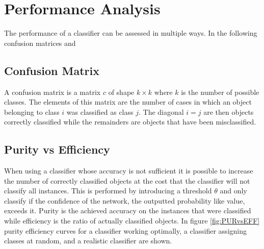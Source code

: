 %
%

\section{Performance Analysis}

The performance of a classifier can be assessed in multiple ways. In the following confusion matrices and 

\subsection{Confusion Matrix}
A confusion matrix is a matrix $c$ of shape $k\times k$ where $k$ is the number of possible classes. The elements of this matrix are the number of cases in which an object belonging to class $i$ was classified as class $j$. The diagonal $i=j$ are then objects correctly classified while the remainders are objects that have been misclassified. \\



\subsection{Purity vs Efficiency}

When using a classifier whose accuracy is not sufficient it is possible to increase the number of correctly classified objects at the cost that the classifier will not classify all instances. This is performed by introducing a threshold $\theta$ and only classify if the confidence of the network, the outputted probability like value, exceeds it. Purity is the achieved accuracy on the instances that were classified while efficiency is the ratio of actually classified objects. In figure \ref{fig:PURvsEFF} purity efficiency curves for a classifier working optimally, a classifier assigning classes at random, and a realistic classifier are shown. 


